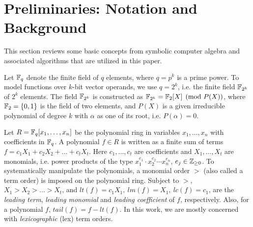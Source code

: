 \section{Preliminaries: Notation and Background}
\label{sec:prelim}
This section reviews some basic concepts from symbolic computer
algebra and associated algorithms that are utilized in this paper. 


Let ${\mathbb{F}}_q$ denote the finite field of $q$ elements, where $q=p^k$ is
a prime power. To model functions over $k$-bit vector operands, we
use $q = 2^k$, i.e. the finite field ${\mathbb{F}}_{2^k}$ of $2^k$
elements. The field ${\mathbb{F}}_{2^k}$ is constructed as ${\mathbb{F}}_{2^k} = {\mathbb{F}}_{2}[X]\pmod{
  P(X)}$, where ${\mathbb{F}}_{2}=\{0,1\}$ is the field of two elements, and
$P(X)$ is a given irreducible polynomial of degree $k$ with $\alpha$
as one of its root, i.e. $P(\alpha) =0$.  

Let $R={\mathbb{F}}_q[x_1,\dots,x_n]$ be the  polynomial ring in variables
$x_1,\dots,x_n$ with coefficients in ${\mathbb{F}}_q$. A polynomial $f \in R$ is 
written as a finite sum of terms  $f = c_1 X_1 +  c_2 X_2 + \dots +
c_t X_t$.  Here $c_1, \dots, c_t$ are coefficients and $X_1, \dots,
X_t$ are monomials, i.e. power products of the type $x_1^{e_{1}}\cdot
x_2^{e_{2}}\cdots x_n^{e_{n}}$,  $e_j \in {\mathbb{Z}}_{\geq  0}$. To
systematically manipulate the polynomials, a monomial order $>$ (also
called a term order) is imposed on the polynomial ring.
Subject to $>$, $X_1 >X_2 > \dots >  X_t$, and 
$lt(f) = c_1 X_1, ~lm(f) = X_1, ~lc(f) = c_1$, are the {\it
leading   term}, {\it   leading monomial} and {\it   leading
coefficient} of $f$, respectively. Also, for a polynomial $f$,
$tail(f) = f - lt(f)$. In this work, we are mostly concerned with {\it
  lexicographic} (lex) term orders. 






